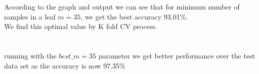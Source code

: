 \documentclass[12pt]{article}
\begin{document}
\\
\\
According to the graph and output we can see that for minimum number of samples in a leaf $m=35$, we get the best accuracy 93.01\%.\\
We find this optimal value by K fold CV process.\\
\\
\\
running with the  $best\_m=35$ parameter we get better performance over the test data set as the accuracy is now 97.35\%
\end{document}
